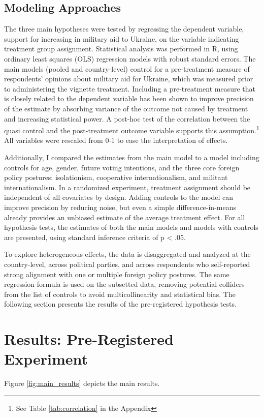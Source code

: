 \subsection{Modeling Approaches}
The three main hypotheses were tested by regressing the dependent variable, support for increasing in military aid to Ukraine, on the variable indicating treatment group assignment. Statistical analysis was performed in R, using ordinary least squares (OLS) regression models with robust standard errors. The main models (pooled and country-level) control for a pre-treatment measure of respondents’ opinions about military aid for Ukraine, which was measured prior to administering the vignette treatment. Including a pre-treatment measure that is closely related to the dependent variable has been shown to improve precision of the estimate by absorbing variance of the outcome not caused by treatment and increasing statistical power.\autocite{mutz_populationbased_2011, clifford_increasing_2021} A post-hoc test of the correlation between the quasi control and the post-treatment outcome variable supports this assumption.\footnote{See Table \ref{tab:correlation} in the Appendix} All variables were rescaled from 0-1 to ease the interpretation of effects.  

Additionally, I compared the estimates from the main model to a model including controls for age, gender, future voting intentions, and the three core foreign policy postures: isolationism, cooperative internationalism, and militant internationalism.\autocite{rathbun_dual_2020} In a randomized experiment, treatment assignment should be independent of all covariates by design. Adding controls to the model can improve precision by reducing noise, but even a simple difference-in-means already provides an unbiased estimate of the average treatment effect.\autocite{mutz_populationbased_2011} For all hypothesis tests, the estimates of both the main models and models with controls are presented, using standard inference criteria of p < .05.

To explore heterogeneous effects, the data is disaggregated and analyzed at the country-level, across political parties, and across respondents who self-reported strong alignment with one or multiple foreign policy postures. The same regression formula is used on the subsetted data, removing potential colliders from the list of controls to avoid multicollinearity and statistical bias. The following section presents the results of the pre-registered hypothesis tests.

\section{Results: Pre-Registered Experiment}
Figure \ref{fig:main_results} depicts the main results.

